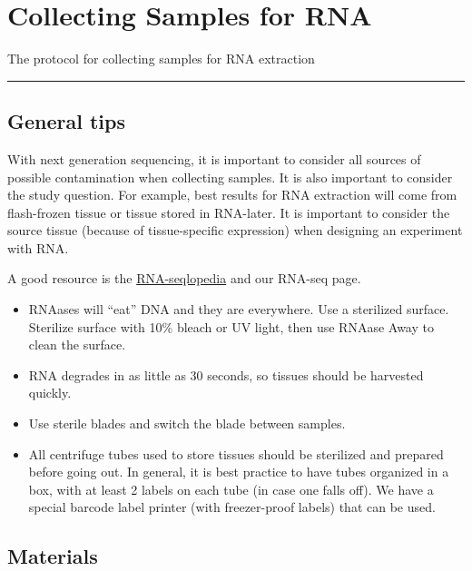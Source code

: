 \documentclass[
  letterpaper,
  DIV=11,
  numbers=noendperiod]{scrreprt}
\begin{document}
\hypertarget{collecting-samples-for-rna}{%
\chapter{Collecting Samples for RNA}\label{collecting-samples-for-rna}}

The protocol for collecting samples for RNA extraction

\begin{center}\rule{0.5\linewidth}{0.5pt}\end{center}

\hypertarget{general-tips}{%
\section*{\texorpdfstring{\textbf{General
tips}}{General tips}}\label{general-tips}}


With next generation sequencing, it is important to consider all sources
of possible contamination when collecting samples. It is also important
to consider the study question. For example, best results for RNA
extraction will come from flash-frozen tissue or tissue stored in
RNA-later. It is important to consider the source tissue (because of
tissue-specific expression) when designing an experiment with RNA.

A good resource is the \href{http://rnaseq.uoregon.edu/}{RNA-seqlopedia}
and our RNA-seq page.

\begin{itemize}
\item
  RNAases will ``eat'' DNA and they are everywhere. Use a sterilized
  surface. Sterilize surface with 10\% bleach or UV light, then use
  RNAase Away to clean the surface.
\item
  RNA degrades in as little as 30 seconds, so tissues should be
  harvested quickly.
\item
  Use sterile blades and switch the blade between samples.
\item
  All centrifuge tubes used to store tissues should be sterilized and
  prepared before going out. In general, it is best practice to have
  tubes organized in a box, with at least 2 labels on each tube (in case
  one falls off). We have a special barcode label printer (with
  freezer-proof labels) that can be used.
\end{itemize}

\hypertarget{materials-2}{%
\section*{Materials}\label{materials-2}}
\end{document}
